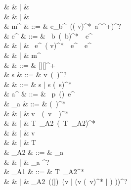 \documentclass[a4paper]{article}
\begin{document}
\begin{grammar}
                                    &              & |   & \varepsilon\ \code{\&\&}\ \varepsilon \\
                                    &              & |   & \varepsilon\ \code{||}\ \varepsilon \\
           & m^{}  & ::= & {e_b}^{}\ ((\code{!} v)^*\ {a^{}}^+)^? \\
                   & e^{}  & ::= & \ b\ (\ b)^*\ \ e^{}\\
                                    &              & |   & \ e^{}\ (\code{!} v)^*\ \ e^{}\ \ e^{} \\
                                    &              & |   & m^{} \\
                         & \kappa       & ::= & [||]^+ \\
               & s            & ::= & v\ (\code{:<}\ \kappa)^? \\
              &  & ::= & s | \code{(} s (\code{,}\ s)^*\code{)} \\
                  & a^{}  & ::= & \code{|}\ p\ (\code{=>|->|\textasciitilde>})\ e^{} \\
                     & \tau_a       & ::= & \code{(} \tau (\code{,}\ \tau)^* \code{)} \\
                                    &              & |   & \code{\{} v\ \code{:}\ \tau (\code{,}\ v\ \code{:}\ \tau)^* \code{\}} \\
                                    &              & |   & \code{<} T\ \tau_{A2}\ (\code{|}\ T\ \tau_{A2})^* \code{>} \\
                                    &              & |   & v \\
                                    &              & |   & T \\
                      & \tau_{A2}    & ::= & \code{\#} \tau_a \\
                                    &              & |   & \tau_a \code{!}^? \\
                      & \tau_{A1}    & ::= & T\ \tau_{A2}^* \\
                                    &              & |   & \tau_{A2}\ ((|)\ (v | \code{(} (v (\code{,}\ v)^* | ) \code{)}))^? \\

\end{grammar}
\end{document}
